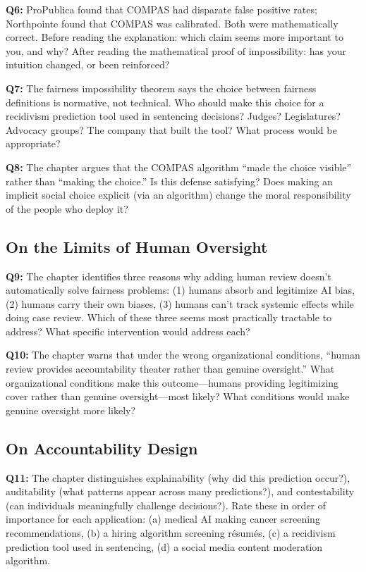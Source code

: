 \textbf{Q6:} ProPublica found that COMPAS had disparate false positive rates; Northpointe found that COMPAS was calibrated. Both were mathematically correct. Before reading the explanation: which claim seems more important to you, and why? After reading the mathematical proof of impossibility: has your intuition changed, or been reinforced?

\textbf{Q7:} The fairness impossibility theorem says the choice between fairness definitions is normative, not technical. Who should make this choice for a recidivism prediction tool used in sentencing decisions? Judges? Legislatures? Advocacy groups? The company that built the tool? What process would be appropriate?

\textbf{Q8:} The chapter argues that the COMPAS algorithm ``made the choice visible'' rather than ``making the choice.'' Is this defense satisfying? Does making an implicit social choice explicit (via an algorithm) change the moral responsibility of the people who deploy it?

\subsection*{On the Limits of Human Oversight}

\textbf{Q9:} The chapter identifies three reasons why adding human review doesn't automatically solve fairness problems: (1) humans absorb and legitimize AI bias, (2) humans carry their own biases, (3) humans can't track systemic effects while doing case review. Which of these three seems most practically tractable to address? What specific intervention would address each?

\textbf{Q10:} The chapter warns that under the wrong organizational conditions, ``human review provides accountability theater rather than genuine oversight.'' What organizational conditions make this outcome---humans providing legitimizing cover rather than genuine oversight---most likely? What conditions would make genuine oversight more likely?

\subsection*{On Accountability Design}

\textbf{Q11:} The chapter distinguishes explainability (why did this prediction occur?), auditability (what patterns appear across many predictions?), and contestability (can individuals meaningfully challenge decisions?). Rate these in order of importance for each application: (a) medical AI making cancer screening recommendations, (b) a hiring algorithm screening résumés, (c) a recidivism prediction tool used in sentencing, (d) a social media content moderation algorithm.


